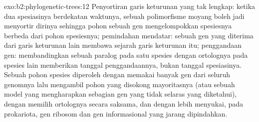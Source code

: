 \begin{solution}{exo:b2:phylogenetic-trees:12}
Penyortiran garis keturunan yang tak lengkap: ketika dua spesiasinya
berdekatan waktunya, sebuah polimorfisme moyang boleh jadi menyortir
dirinya sehingga pohon sebuah gen mengelompokkan spesiesnya berbeda
dari pohon spesiesnya; pemindahan mendatar: sebuah gen yang diterima
dari garis keturunan lain membawa sejarah garis keturunan itu;
penggandaan gen: membandingkan sebuah paralog pada satu spesies dengan
ortolognya pada spesies lain memberikan tanggal penggandaannya, bukan
tanggal spesiasinya. Sebuah pohon spesies diperoleh dengan memakai
banyak gen dari seluruh genomnya lalu mengambil pohon yang disokong
mayoritasnya (atau sebuah model yang mengharapkan sebagian gen yang
tidak selaras yang diketahui), dengan memilih ortolognya secara
saksama, dan dengan lebih menyukai, pada prokariota, gen ribosom dan
gen informasional yang jarang dipindahkan.
\end{solution}

